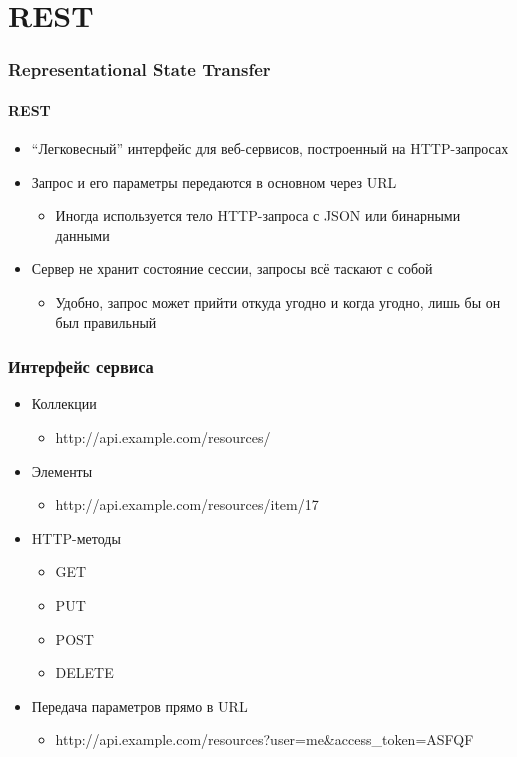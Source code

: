 \documentclass[xetex,mathserif,serif]{beamer}
\begin{document}
    \section{REST}

    \begin{frame}
        \frametitle{Representational State Transfer}
        \framesubtitle{REST}
        \begin{itemize}
            \item ``Легковесный'' интерфейс для веб-сервисов, построенный на HTTP-запросах
            \item Запрос и его параметры передаются в основном через URL
            \begin{itemize}
                \item Иногда используется тело HTTP-запроса с JSON или бинарными данными
            \end{itemize}
            \item Сервер не хранит состояние сессии, запросы всё таскают с собой
            \begin{itemize}
                \item Удобно, запрос может прийти откуда угодно и когда угодно, лишь бы он был правильный
            \end{itemize}
        \end{itemize}
    \end{frame}

    \begin{frame}
        \frametitle{Интерфейс сервиса}
        \begin{itemize}
            \item Коллекции
            \begin{itemize}
                \item http://api.example.com/resources/
            \end{itemize}
            \item Элементы
            \begin{itemize}
                \item http://api.example.com/resources/item/17
            \end{itemize}
            \item HTTP-методы
            \begin{itemize}
                \item GET
                \item PUT
                \item POST
                \item DELETE
            \end{itemize}
            \item Передача параметров прямо в URL
            \begin{itemize}
                \item http://api.example.com/resources?user=me\&access\_token=ASFQF
            \end{itemize}
        \end{itemize}
    \end{frame}
\end{document}
